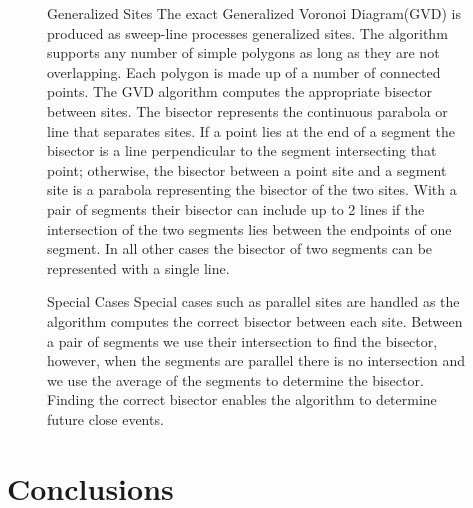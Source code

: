 \documentclass{egpubl}
\begin{document}
\begin{figure}
	\centering
	\caption{Generalized Sites
		\protect{} The exact Generalized Voronoi Diagram(GVD) is produced as sweep-line processes generalized sites. The algorithm supports any number of simple polygons as long as they are not overlapping. Each polygon is made up of a number of connected points. The GVD algorithm computes the appropriate bisector between sites. The bisector represents the continuous parabola or line that separates sites. If a point lies at the end of a segment the bisector is a line perpendicular to the segment intersecting that point; otherwise, the bisector between a point site and a segment site is a parabola representing the bisector of the two sites. With a pair of segments their bisector can include up to 2 lines if the intersection of the two segments lies between the endpoints of one segment. In all other cases the bisector of two segments can be represented with a single line.
	}
	\label{fig:gvd}
\end{figure}


\begin{figure}
	\centering
	\caption{Special Cases
		\protect{} Special cases such as parallel sites are handled as the algorithm computes the correct bisector between each site. Between a pair of segments we use their intersection to find the bisector, however, when the segments are parallel there is no intersection and we use the average of the segments to determine the bisector. Finding the correct bisector enables the algorithm to determine future close events. 
	}
	\label{fig:gvd}
\end{figure}


\section{Conclusions}

\end{document}

